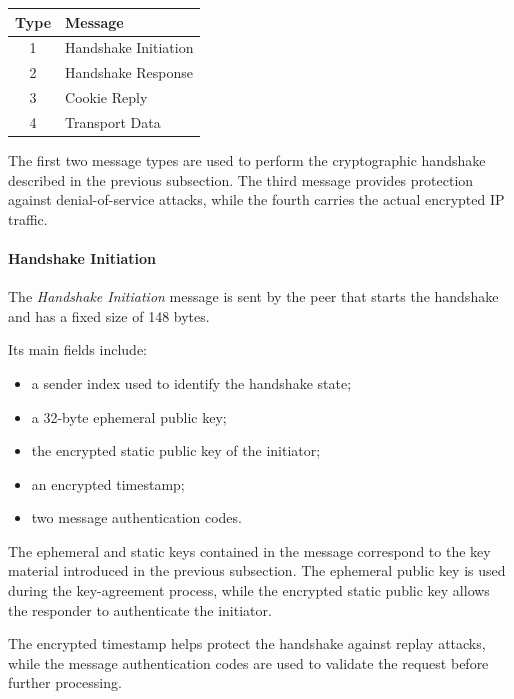 \begin{table}[htbp]
	\centering
	\label{tab:wireguard-message-types}

	\begin{tabular}{cl}
		\toprule
		Type & Message              \\
		\midrule
		1    & Handshake Initiation \\
		2    & Handshake Response   \\
		3    & Cookie Reply         \\
		4    & Transport Data       \\
		\bottomrule
	\end{tabular}
\end{table}

\newpage
The first two message types are used to perform the cryptographic handshake described in the previous subsection. The third message provides protection against denial-of-service attacks, while the fourth carries the actual encrypted IP traffic.

\paragraph{Handshake Initiation}

The \textit{Handshake Initiation} message is sent by the peer that starts the handshake and has a fixed size of 148 bytes.

Its main fields include:

\begin{itemize}
	\item a sender index used to identify the handshake state;
	\item a 32-byte ephemeral public key;
	\item the encrypted static public key of the initiator;
	\item an encrypted timestamp;
	\item two message authentication codes.
\end{itemize}

The ephemeral and static keys contained in the message correspond to the key material introduced in the previous subsection. The ephemeral public key is used during the key-agreement process, while the encrypted static public key allows the responder to authenticate the initiator.

The encrypted timestamp helps protect the handshake against replay attacks, while the message authentication codes are used to validate the request before further processing.

